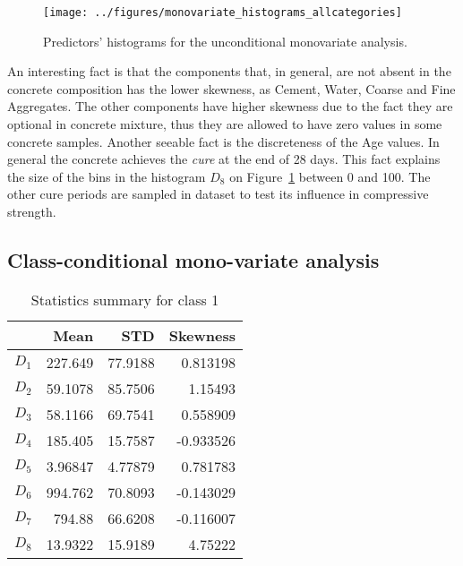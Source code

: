 \documentclass[conference]{IEEEtran}
\begin{document}
\begin{figure}[htbp]
\centerline{\texttt{[image: ../figures/monovariate\_histograms\_allcategories]}}
\caption{Predictors' histograms for the unconditional monovariate analysis.}
\label{uncond_monovariate}
\end{figure}

An interesting fact is that the components that, in general, are not absent in the concrete composition has the lower skewness, as Cement, Water, Coarse and Fine Aggregates. The other components have higher skewness due to the fact they are optional in concrete mixture, thus they are allowed to have zero values in some concrete samples. Another seeable fact is the discreteness of the Age values. In general the concrete achieves the \emph{cure} at the end of 28 days. This fact explains the size of the bins in the histogram $D_8$ on Figure~\ref{uncond_monovariate} between 0 and 100. The other cure periods are sampled in dataset to test its influence in compressive strength.

\subsection{Class-conditional mono-variate analysis}

\begin{table}[htp]
  \caption{Statistics summary for class 1}
    \centering
    \begin{tabular}{@{} crrr @{}}
      \toprule
       & Mean & STD & Skewness \\ 
      \midrule
      $D_1$ & 227.649  &   77.9188  &   0.813198 \\ 
      $D_2$ & 59.1078  &  85.7506  &   1.15493 \\ 
      $D_3$ & 58.1166  &  69.7541   &  0.558909 \\ 
      $D_4$ & 185.405  &   15.7587  &  -0.933526\\ 
      $D_5$ & 3.96847  &  4.77879  &  0.781783 \\ 
      $D_6$ & 994.762   &  70.8093  &  -0.143029 \\ 
      $D_7$ & 794.88   &   66.6208  &  -0.116007 \\ 
      $D_8$ & 13.9322  &  15.9189  &   4.75222 \\       
      \bottomrule
    \end{tabular}
  \label{statistics_table_class_1}
  \end{table}%
\end{document}

